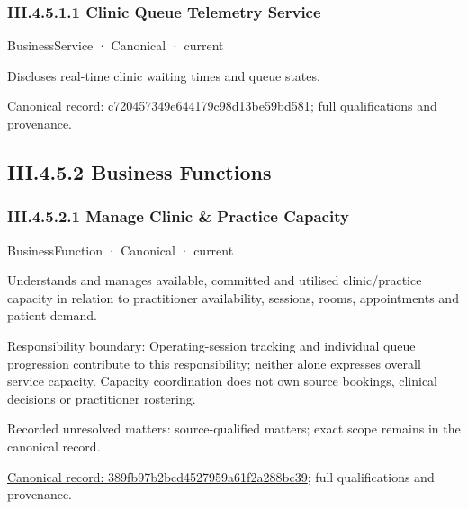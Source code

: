 \subsubsection*{III.4.5.1.1 Clinic Queue Telemetry Service}
\label{navigation:III.4.5.1.1}

\label{element:c720457349e644179c98d13be59bd581}
{\small BusinessService · Canonical · current}\par

Discloses real-time clinic waiting times and queue states.


{\footnotesize \href{../../../../continuum/business/business-service/c720457349e644179c98d13be59bd581.md}{Canonical record: c720457349e644179c98d13be59bd581}; full qualifications and provenance.}\par
\subsection*{III.4.5.2 Business Functions}
\label{navigation:III.4.5.2}

\subsubsection*{III.4.5.2.1 Manage Clinic \& Practice Capacity}
\label{navigation:III.4.5.2.1}

\label{element:389fb97b2bcd4527959a61f2a288bc39}
{\small BusinessFunction · Canonical · current}\par

Understands and manages available, committed and utilised clinic/practice capacity in relation to practitioner availability, sessions, rooms, appointments and patient demand.



Responsibility boundary: Operating-session tracking and individual queue progression contribute to this responsibility; neither alone expresses overall service capacity. Capacity coordination does not own source bookings, clinical decisions or practitioner rostering.


{\small Recorded unresolved matters: source-qualified matters; exact scope remains in the canonical record.}\par
{\footnotesize \href{../../../../continuum/business/business-function/389fb97b2bcd4527959a61f2a288bc39.md}{Canonical record: 389fb97b2bcd4527959a61f2a288bc39}; full qualifications and provenance.}\par
